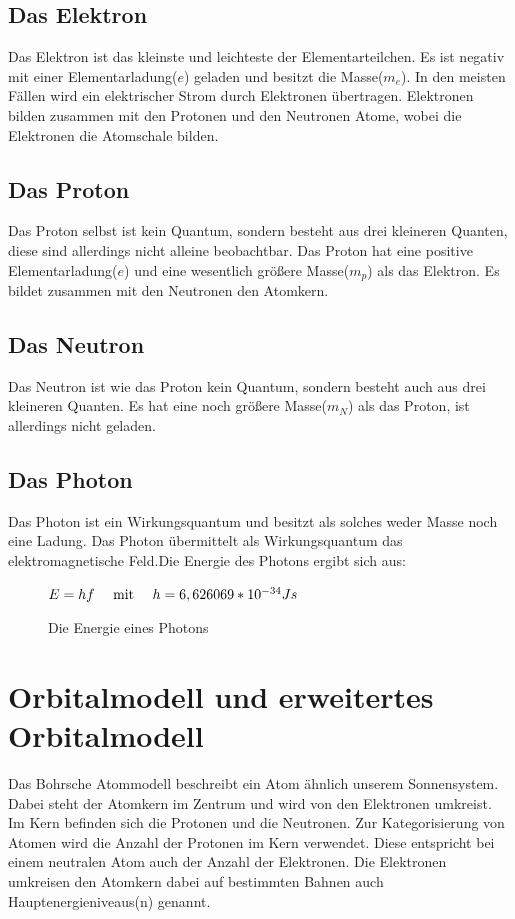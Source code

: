 \documentclass[11pt,a4paper,oneside]{report}
\begin{document}
\subsection{Das Elektron}
Das Elektron ist das kleinste und leichteste der Elementarteilchen. Es ist negativ mit einer Elementarladung($e$) geladen und besitzt die Masse($m_e$). In den meisten Fällen wird ein elektrischer Strom durch Elektronen übertragen. Elektronen bilden zusammen mit den Protonen und den Neutronen Atome, wobei die Elektronen die Atomschale bilden.

\subsection{Das Proton}
Das Proton selbst ist kein Quantum, sondern besteht aus drei kleineren Quanten, diese sind allerdings nicht alleine beobachtbar. Das Proton hat eine positive Elementarladung($e$) und eine wesentlich größere Masse($m_p$) als das Elektron. Es bildet zusammen mit den Neutronen den Atomkern.

\subsection{Das Neutron}
Das Neutron ist wie das Proton kein Quantum, sondern besteht auch aus drei kleineren Quanten. Es hat eine noch größere Masse($m_N$) als das Proton, ist allerdings nicht geladen.

\subsection{Das Photon}
Das Photon ist ein Wirkungsquantum und besitzt als solches weder Masse noch eine Ladung. Das Photon übermittelt als Wirkungsquantum das elektromagnetische Feld.Die Energie des Photons ergibt sich aus: 

\begin{figure}[ht]
\centering
$E=hf \text{\hspace{1em} mit \hspace{1em}} h=6,626069*10^{-34}Js$
\caption{Die Energie eines Photons\cite[S. 421]{stroppe08}}
\end{figure}

\section{Orbitalmodell und erweitertes Orbitalmodell}
Das Bohrsche Atommodell beschreibt ein Atom ähnlich unserem Sonnensystem. Dabei steht der Atomkern im Zentrum und wird von den Elektronen umkreist. Im Kern befinden sich die Protonen und die Neutronen. Zur Kategorisierung von Atomen wird die Anzahl der Protonen im Kern verwendet. Diese entspricht bei einem neutralen Atom auch der Anzahl der Elektronen. Die Elektronen umkreisen den Atomkern dabei auf bestimmten Bahnen auch Hauptenergieniveaus(n) genannt\cite{hefterCh}.
\end{document}
